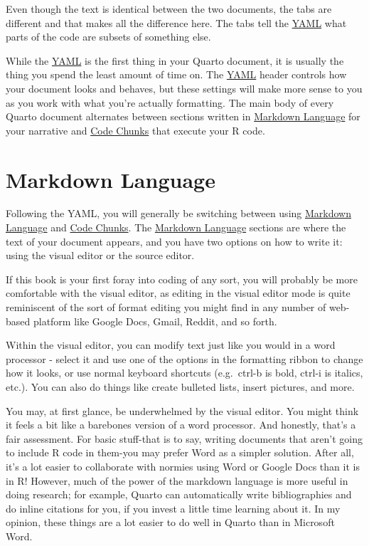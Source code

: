 \documentclass[
  letterpaper,
]{book}
\begin{document}
\begin{tcolorbox}
Even though the text is identical between the two documents, the tabs
are different and that makes all the difference here. The tabs tell the
\hyperref[yaml]{YAML} what parts of the code are subsets of something
else.

\end{tcolorbox}

While the \hyperref[yaml]{YAML} is the first thing in your Quarto
document, it is usually the thing you spend the least amount of time on.
The \hyperref[yaml]{YAML} header controls how your document looks and
behaves, but these settings will make more sense to you as you work with
what you're actually formatting. The main body of every Quarto document
alternates between sections written in
\hyperref[markdown-language]{Markdown Language} for your narrative and
\hyperref[code-chunks]{Code Chunks} that execute your R code.

\section{Markdown Language}\label{markdown-language}

Following the YAML, you will generally be switching between using
\hyperref[markdown-language]{Markdown Language} and
\hyperref[code-chunks]{Code Chunks}. The
\hyperref[markdown-language]{Markdown Language} sections are where the
text of your document appears, and you have two options on how to write
it: using the visual editor or the source editor.

If this book is your first foray into coding of any sort, you will
probably be more comfortable with the visual editor, as editing in the
visual editor mode is quite reminiscent of the sort of format editing
you might find in any number of web-based platform like Google Docs,
Gmail, Reddit, and so forth.

Within the visual editor, you can modify text just like you would in a
word processor - select it and use one of the options in the formatting
ribbon to change how it looks, or use normal keyboard shortcuts
(e.g.~ctrl-b is bold, ctrl-i is italics, etc.). You can also do things
like create bulleted lists, insert pictures, and more.

You may, at first glance, be underwhelmed by the visual editor. You
might think it feels a bit like a barebones version of a word processor.
And honestly, that's a fair assessment. For basic stuff-that is to say,
writing documents that aren't going to include R code in them-you may
prefer Word as a simpler solution. After all, it's a lot easier to
collaborate with normies using Word or Google Docs than it is in R!
However, much of the power of the markdown language is more useful in
doing research; for example, Quarto can automatically write
bibliographies and do inline citations for you, if you invest a little
time learning about it. In my opinion, these things are a lot easier to
do well in Quarto than in Microsoft Word.
\end{document}

